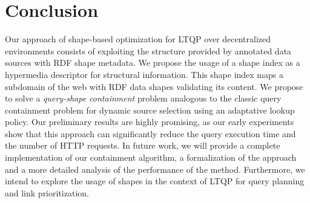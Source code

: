 \section{Conclusion}
Our approach of shape-based optimization for LTQP over decentralized environments consists of exploiting the structure provided by
annotated data sources with RDF shape metadata. 
We propose the usage of a shape index as a hypermedia descriptor for structural information.
This shape index maps a subdomain of the web with RDF data shapes validating its content.
We propose to solve a \emph{query-shape containment} problem analogous to the classic query containment problem for dynamic source selection
using an adaptative lookup policy. 
Our preliminary results are highly promising,
as our early experiments show that this approach can significantly reduce the query execution time and the number of HTTP requests.
In future work, we will provide a complete implementation of our containment algorithm,
a formalization of the approach and a more detailed analysis of the performance of the method.
Furthermore, we intend to explore the usage of shapes in the context of LTQP for query planning and link prioritization.